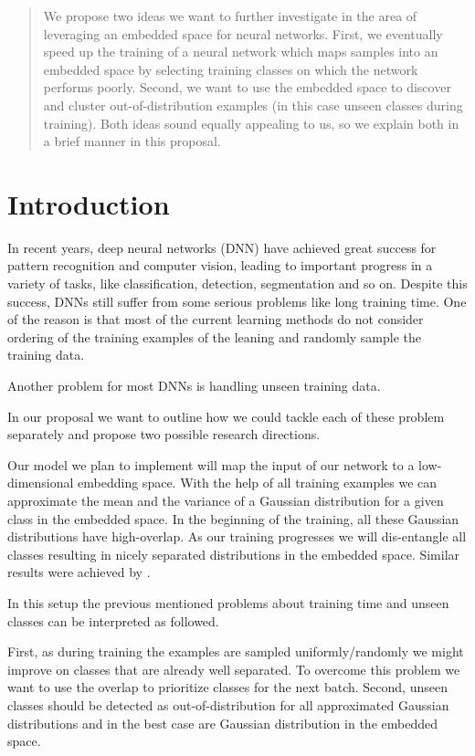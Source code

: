 \begin{abstract}
	We propose two ideas we want to further investigate in the area of leveraging an embedded space for neural networks. First, we eventually speed up the training of a neural network which maps samples into an embedded space by selecting training classes on which the network performs poorly. Second, we want to use the embedded space to discover and cluster out-of-distribution examples (in this case unseen classes during training). Both ideas sound equally appealing to us, so we explain both in a brief manner in this proposal.
\end{abstract}

\section{Introduction}
In recent years, deep neural networks (DNN) have achieved great success for pattern recognition and computer vision, leading to important progress in a variety of tasks, like classification, detection, segmentation and so on. Despite this success, DNNs still suffer from some serious problems like long training time. One of the reason is that most of the current learning methods do not consider ordering of the training examples of the leaning and randomly sample the training data. 

Another problem for most DNNs is handling unseen training data. 

In our proposal we want to outline how we could tackle each of these problem separately and propose two possible research directions.

Our model we plan to implement will map the input of our network to a low-dimensional embedding space. With the help of all training examples we can approximate the mean and the variance of a Gaussian distribution for a given class in the embedded space. In the beginning of the training, all these Gaussian distributions have high-overlap. As our training progresses we will dis-entangle all classes resulting in nicely separated distributions in the embedded space. Similar results were achieved by \cite{yang2018robust}.

In this setup the previous mentioned problems about training time and unseen classes can be interpreted as followed.

First, as during training the examples are sampled uniformly/randomly we might improve on classes that are already well separated. To overcome this problem we want to use the overlap to prioritize classes for the next batch. Second, unseen classes should be detected as out-of-distribution for all approximated Gaussian distributions and in the best case are Gaussian distribution in the embedded space.

